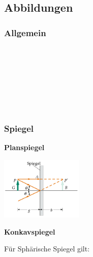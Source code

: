 \subsection{Abbildungen}
\subsubsection{Allgemein}
 \\
\begin{center}
	\begin{minipage}{0.3\textwidth}
		 \\
		 \\
	\end{minipage}%
	\begin{minipage}{0.3\textwidth}
		 \\
		 \\
	\end{minipage}
\end{center}

\pagebreak

\subsubsection{Spiegel}

\textbf{Planspiegel}
\begin{center}
	\includegraphics[height=3cm,keepaspectratio=true]{Images/planspiegel.png}
\end{center}


\textbf{Konkavspiegel}

\begin{center}
	\begin{minipage}{0.3\textwidth}
		Für Sphärische Spiegel gilt:
	\end{minipage}%
	\begin{minipage}{0.3\textwidth}
		 \\
	\end{minipage}
\end{center}

